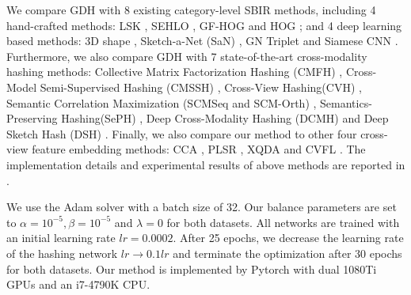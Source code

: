 \documentclass[runningheads]{llncs}
\begin{document}
We compare GDH with 8 existing category-level SBIR methods, including 4 hand-crafted methods: LSK \cite{SaavedraB15}, SEHLO \cite{Saavedra14}, GF-HOG \cite{hu2010} and HOG \cite{dalal2005}; and 4 deep learning based methods: 3D shape \cite{WangKL15}, Sketch-a-Net (SaN) \cite{sketchanet}, GN Triplet \cite{SangkloyBHH16} and Siamese CNN \cite{QiSZL16}. Furthermore, we also compare GDH with 7 state-of-the-art cross-modality hashing methods: Collective Matrix Factorization Hashing (CMFH) \cite{DingGZ14}, Cross-Model Semi-Supervised Hashing (CMSSH) \cite{BronsteinBMP10},
Cross-View Hashing(CVH) \cite{KumarU11}, Semantic Correlation Maximization (SCMSeq and SCM-Orth) \cite{ZhangL14}, Semantics-Preserving Hashing(SePH) \cite{LinDH015}, Deep Cross-Modality Hashing (DCMH) \cite{JiangL17} and Deep Sketch Hash (DSH) \cite{LiuSSLS17}. Finally, we also compare our method to other four cross-view feature embedding
methods: CCA \cite{ViaSP05}, PLSR \cite{LiuMHCZ18}, XQDA \cite{LiaoHZL15} and CVFL \cite{XiePX14}. The implementation details and experimental results of above methods are reported in \cite{LiuSSLS17}.

We use the Adam solver \cite{KingmaB14} with a batch size of 32. 
Our balance parameters are set to $\alpha=10^{-5}, \beta=10^{-5}$ and $\lambda=0$ for both datasets.
All networks are trained with an initial learning rate $lr=0.0002$. After 25 epochs, we decrease the learning rate of the hashing network $lr\rightarrow 0.1lr$ and terminate the optimization after 30 epochs for both datasets. Our method is implemented by Pytorch with
dual 1080Ti GPUs and an i7-4790K CPU.
\end{document}
